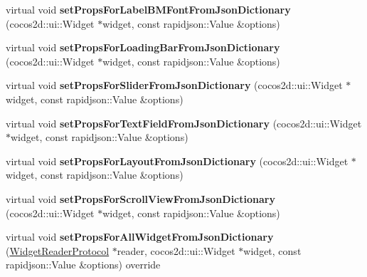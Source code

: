 \begin{DoxyCompactItemize}
\item 
\mbox{\label{classcocostudio_1_1WidgetPropertiesReader0250_a25a402dbb50043d95bb7ebef038a0d35}} 
virtual void {\bfseries set\+Props\+For\+Label\+B\+M\+Font\+From\+Json\+Dictionary} (cocos2d\+::ui\+::\+Widget $\ast$widget, const rapidjson\+::\+Value \&options)
\item 
\mbox{\label{classcocostudio_1_1WidgetPropertiesReader0250_a14d2daef68593f1f74906df29a07c762}} 
virtual void {\bfseries set\+Props\+For\+Loading\+Bar\+From\+Json\+Dictionary} (cocos2d\+::ui\+::\+Widget $\ast$widget, const rapidjson\+::\+Value \&options)
\item 
\mbox{\label{classcocostudio_1_1WidgetPropertiesReader0250_a40a699b7489cceb9b47df65099545f54}} 
virtual void {\bfseries set\+Props\+For\+Slider\+From\+Json\+Dictionary} (cocos2d\+::ui\+::\+Widget $\ast$widget, const rapidjson\+::\+Value \&options)
\item 
\mbox{\label{classcocostudio_1_1WidgetPropertiesReader0250_a4279a5ebc8960209c56b0c5bfa71de18}} 
virtual void {\bfseries set\+Props\+For\+Text\+Field\+From\+Json\+Dictionary} (cocos2d\+::ui\+::\+Widget $\ast$widget, const rapidjson\+::\+Value \&options)
\item 
\mbox{\label{classcocostudio_1_1WidgetPropertiesReader0250_a1bd5208d3f6975a193b6fc733cccb8e5}} 
virtual void {\bfseries set\+Props\+For\+Layout\+From\+Json\+Dictionary} (cocos2d\+::ui\+::\+Widget $\ast$widget, const rapidjson\+::\+Value \&options)
\item 
\mbox{\label{classcocostudio_1_1WidgetPropertiesReader0250_a8855ba9e67bfa2a6aa2072a2960aa522}} 
virtual void {\bfseries set\+Props\+For\+Scroll\+View\+From\+Json\+Dictionary} (cocos2d\+::ui\+::\+Widget $\ast$widget, const rapidjson\+::\+Value \&options)
\item 
\mbox{\label{classcocostudio_1_1WidgetPropertiesReader0250_a5c99146a7742f77efbe333abfc5a932c}} 
virtual void {\bfseries set\+Props\+For\+All\+Widget\+From\+Json\+Dictionary} (\hyperlink{classcocostudio_1_1WidgetReaderProtocol}{Widget\+Reader\+Protocol} $\ast$reader, cocos2d\+::ui\+::\+Widget $\ast$widget, const rapidjson\+::\+Value \&options) override

\end{DoxyCompactItemize}
